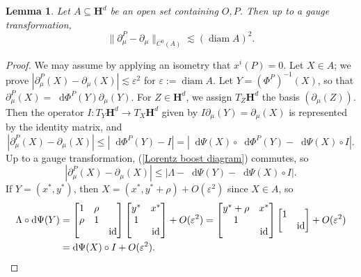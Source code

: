 \documentclass[final,12pt, leqno]{brownthesis}
\newcommand{\Hyp}{\mathbf H}
\DeclareMathOperator{\diam}{diam}
\DeclareMathOperator{\id}{id}
\newcommand*\dif{\mathop{}\!\mathrm{d}}
\newtheorem{lemma}[theorem]{Lemma}
\theoremstyle{definition}
\numberwithin{equation}{section}
\begin{document}
\begin{lemma}\label{DoVF lemma}
Let $A \subseteq \Hyp^d$ be an open set containing $O, P$.
Then up to a gauge transformation,
\begin{equation}\label{difference of vector fields}
\|\partial^P_\mu - \partial_\mu\|_{C^0(A)} \lesssim (\diam A)^2.
\end{equation}
\end{lemma}
\begin{proof}
We may assume by applying an isometry that $x^i(P) = 0$.
Let $X \in A$; we prove $|\partial^P_\mu(X) - \partial_\mu(X)| \lesssim \varepsilon^2$ for $\varepsilon := \diam A$.
Let $Y = (\Phi^P)^{-1}(X)$, so that $\partial^P_\mu(X) = \dif \Phi^P(Y) \partial_\mu(Y)$.
For $Z \in \Hyp^d$, we assign $T_Z \Hyp^d$ the basis $(\partial_\mu(Z))$.
Then the operator $I: T_Y \Hyp^d \to T_X \Hyp^d$ given by $I \partial_\mu(Y) = \partial_\mu(X)$ is represented by the identity matrix, and
$$|\partial^P_\mu(X) - \partial_\mu(X)| \leq |\dif \Phi^P(Y) - I| = |\dif \Psi(X) \circ \dif \Phi^P(Y) - \dif \Psi(X) \circ I|.$$
Up to a gauge transformation, (\ref{Lorentz boost diagram}) commutes, so
$$|\partial^P_\mu(X) - \partial_\mu(X)| \leq |\Lambda - \dif \Psi(Y) - \dif \Psi(X) \circ I|.$$
If $Y = (x^*, y^*)$, then $X = (x^*, y^* + \rho) + O(\varepsilon^2)$ \cite[(4.5.5)]{ratcliffe2006foundations} since $X \in A$, so
\begin{align*}
\Lambda \circ \dif \Psi(Y) &= \begin{bmatrix}1 & \rho \\ \rho & 1 \\ && \id \end{bmatrix} \begin{bmatrix}y^* & x^* \\ 1 \\ & \id \end{bmatrix} + O(\varepsilon^2) = \begin{bmatrix}y^* + \rho & x^* \\ 1 \\ & \id\end{bmatrix} \begin{bmatrix}1 \\ & \id\end{bmatrix} + O(\varepsilon^2) \\
&= \dif \Psi(X) \circ I + O(\varepsilon^2). \qedhere
\end{align*}
\end{proof}
\end{document}
